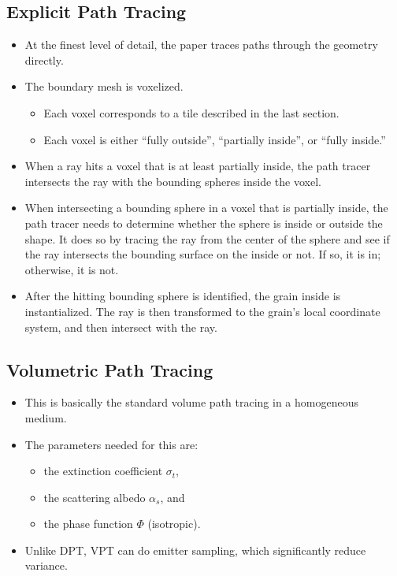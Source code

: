 \documentclass[10pt]{article}
\begin{document}
  \subsection{Explicit Path Tracing}
  \begin{itemize}
  	\item At the finest level of detail, the paper traces paths through the geometry directly.

  	\item The boundary mesh is voxelized.
  	\begin{itemize}
  		\item Each voxel corresponds to a tile described in the last section.
  		\item Each voxel is either ``fully outside'', ``partially inside'', or ``fully inside.''
  	\end{itemize}
  	 
  	\item When a ray hits a voxel that is at least partially inside, the path tracer intersects the ray with the bounding spheres inside the voxel.

  	\item When intersecting a bounding sphere in a voxel that is partially inside, the path tracer needs to determine whether the sphere is inside or outside the shape.  It does so by tracing the ray from the center of the sphere and see if the ray intersects the bounding surface on the inside or not.  If so, it is in; otherwise, it is not.

  	\item After the hitting bounding sphere is identified, the grain inside is instantialized.  The ray is then transformed to the grain's local coordinate system, and then intersect with the ray.  	
  \end{itemize}

  \subsection{Volumetric Path Tracing}
  \begin{itemize}
  	\item This is basically the standard volume path tracing in a homogeneous medium.

  	\item The parameters needed for this are:
  	\begin{itemize}
  		\item the extinction coefficient $\sigma_t$,
  		\item the scattering albedo $\alpha_s$, and
  		\item the phase function $\Phi$ (isotropic).
  	\end{itemize}

  	\item Unlike DPT, VPT can do emitter sampling, which significantly reduce variance.
  \end{itemize}
\end{document}
